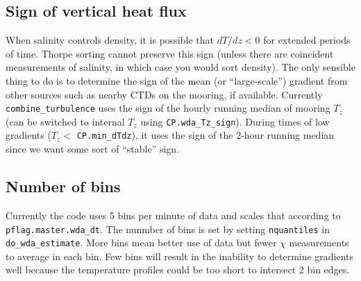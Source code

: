 \subsection{Sign of vertical heat flux}
When salinity controls density, it is possible that $dT/dz < 0$ for extended periods of time.
Thorpe sorting cannot preserve this sign (unless there are coincident measurements of salinity, in which case you would sort density).
The only sensible thing to do is to determine the sign of the mean (or ``large-scale'') gradient from other sources such as nearby CTDs on the mooring, if available.
Currently \texttt{combine\_turbulence} uses the sign of the hourly running median of mooring $T_z$ (can be switched to internal $T_z$ using \texttt{CP.wda\_Tz\_sign}).
During times of low gradients ($T_z < $ \texttt{CP.min\_dTdz}), it uses the sign of the 2-hour running median since we want some sort of ``stable'' sign.

\subsection{Number of bins}

Currently the code uses 5 bins per minute of data and scales that according to \texttt{pflag.master.wda\_dt}. The nunmber of bins is set by setting \texttt{nquantiles} in \texttt{do\_wda\_estimate}. More bins mean better use of data but fewer $χ$ measurements to average in each bin. Few bins will result in the inability to determine gradients well because the temperature profiles could be too short to intersect 2 bin edges.

